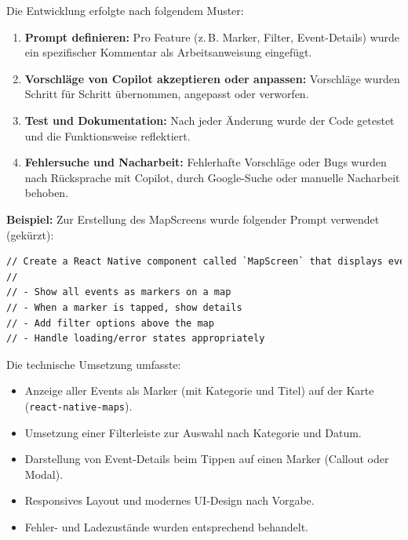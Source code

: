 Die Entwicklung erfolgte nach folgendem Muster:
\begin{enumerate}
      \item \textbf{Prompt definieren:} Pro Feature (z.\,B. Marker, Filter, Event-Details) wurde ein spezifischer Kommentar als Arbeitsanweisung eingefügt.
      \item \textbf{Vorschläge von Copilot akzeptieren oder anpassen:} Vorschläge wurden Schritt für Schritt übernommen, angepasst oder verworfen.
      \item \textbf{Test und Dokumentation:} Nach jeder Änderung wurde der Code getestet und die Funktionsweise reflektiert.
      \item \textbf{Fehlersuche und Nacharbeit:} Fehlerhafte Vorschläge oder Bugs wurden nach Rücksprache mit Copilot, durch Google-Suche oder manuelle Nacharbeit behoben.
\end{enumerate}

\textbf{Beispiel:}
Zur Erstellung des MapScreens wurde folgender Prompt verwendet (gekürzt):

\begin{lstlisting}[language=HTML]
// Create a React Native component called `MapScreen` that displays event markers on a map using event data from the `EventsProvider` context. Requirements:
//
// - Show all events as markers on a map
// - When a marker is tapped, show details
// - Add filter options above the map
// - Handle loading/error states appropriately
\end{lstlisting}

Die technische Umsetzung umfasste:
\begin{itemize}
      \item Anzeige aller Events als Marker (mit Kategorie und Titel) auf der Karte
            (\texttt{react-native-maps}).
      \item Umsetzung einer Filterleiste zur Auswahl nach Kategorie und Datum.
      \item Darstellung von Event-Details beim Tippen auf einen Marker (Callout oder
            Modal).
      \item Responsives Layout und modernes UI-Design nach Vorgabe.
      \item Fehler- und Ladezustände wurden entsprechend behandelt.
\end{itemize}

